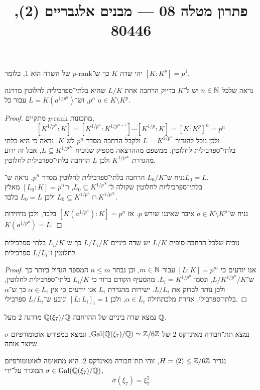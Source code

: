 
\title{פתרון מטלה 08 --- מבנים אלגבריים (2), 80446}


\maketitle
\maketitleprint[red]

\question{}
יהי שדה $K$ כך ש־$p\text{-rank}$ של השדה הוא 1, כלומר $[K : K^p] = p^1$.

\subquestion{}
נראה שלכל $n \in \mathbb{N}$ יש ל־$K$ בדיוק הרחבה אחת $L / K$ שהיא בלתי־ספרבילית לחלוטין מדרגה $p^n$,
וש־$L = K(a^{1 / p^n})$ עבור כל $a \in K \setminus K^p$.
\begin{proof}
	מתכונות $p \text{-rank}$ מתקיים,
	\[
		[K^{1 / p^n} : K]
		=
		[K^{1 / p^n} : K^{1 / p^{n - 1}}]
		\cdots
		[K^{1 / p} : K]
		= {[K : K^p]}^n
		= p^n
	\]
	ולכן נוכל להגדיר $L = K^{1 / p^n}$ ולקבל הרחבה מסדר $p^n$ לש $K$.
	נראה כי היא בלתי בלתי־ספרבילית לחלוטין.
	ממשפט מההרצאה מספיק שנוכיח $L \subseteq K^{1 / p^\infty}$, אבל זה ידוע מהגדרת $K^{1 / p^\infty}$ ולכן $L$ הרחבה בלתי־ספרבילית לחלוטין.

	נניח ש־$L_0 / K$ הרחבה בלתי־ספרבילית לחלוטין מסדר $p^n$, נראה ש־$L_0 = L$. \\
	בלתי־ספרביליות לחלוטין שקולה ל־$L_0 \subseteq K^{1 / p^\infty}$, ו־$[L_0 : K] = p^n$ מאלץ $L_0 \subseteq K^{1 / p^n} \cap K^{1 / p^\infty}$ ולכן $L_0 = L$ בלבד.

	נניח ש־$a \in K \setminus K^p$ איבר שאיננו שורש $p$.
	אז $[K(a^{1 / p^n}) : K] = p^n$ בלבד, ולכן מיחידות $K(a^{1 / p^n}) = L$.
\end{proof}

\subquestion{}
נוכיח שלכל הרחבה סופית $L / K$ יש שדה ביניים $L / L_i / K$ כך ש־$L_i / K$ בלתי־ספרבילית לחלוטין ו־$L / L_i$ ספרבילית.
\begin{proof}
	אנו יודעים כי $[L : K] = p^m$ עבור $m \in \mathbb{N}$, וכן נבחר $n \le m$ המספר הגדול ביותר כך ש־$L / K^{1 / p^n} / K$, ונסמן $L_i = K^{1 / p^n}$.
	מהסעיף הקודם ברור כי $L_i / K$ בלתי־ספרבילית לחלוטין, ולכן נותר לבדוק את $L / L_i$.
	ישירות מהגדרת $L_i$ אנו יודעים כי אין $\alpha \in L_i$ כך ש־$\alpha$ בלתי־ספרבילי, אחרת מלכתחילה $\alpha \in L_i$, ולכן ${[L : L_i]}_i = 1$ ונובע ש־$L / L_i$ ספרבילי.
\end{proof}

\question{}
נמצא שדה ביניים של ההרחבה $\mathbb{Q}(\xi_7) / \mathbb{Q}$ מדרגה $2$ מעל $\mathbb{Q}$.

\subquestion{}
נמצא תת־חבורה מאינדקס $2$ של $\operatorname{Gal}(\mathbb{Q}(\xi_7) / \mathbb{Q}) \simeq \mathbb{Z} / 6\mathbb{Z}$,
ונמצא במפורש אוטומורפיזם $\sigma$ שיוצר אותה.
\begin{solution}
	נגדיר $H = \langle 2 \rangle \le \mathbb{Z} / 6\mathbb{Z}$, זוהי תת־חבורה מאינדקס $2$.
	היא מתאימה לאוטומורפיזם $\sigma \in \operatorname{Gal}(\mathbb{Q}(\xi_7) / \mathbb{Q})$ המוגדר על־ידי,
	\[
		\sigma(\xi_7)
		= \xi_7^2
	\]
\end{solution}

